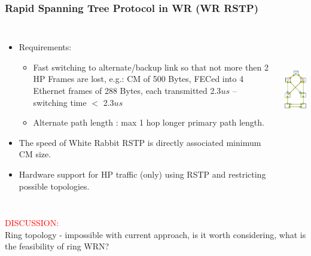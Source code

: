 \documentclass[]{beamer}
\begin{document}
\begin{frame}
  \frametitle{Rapid Spanning Tree Protocol in WR (WR RSTP)}
  
  \begin{columns}[c]
  \column{3.8in} 

  \begin{itemize}
  \item Requirements:
  \begin{itemize}
    \item Fast switching to alternate/backup link so that not more then 2 HP
          Frames are lost, e.g.: CM of 500 Bytes, FECed into 4 Ethernet frames
          of 288 Bytes, each transmitted 2.3$us$ -- switching time $<$ 2.3$us$
    \item Alternate path length : max 1 hop longer primary path length.
  \end{itemize}
  \item The speed of White Rabbit RSTP is directly associated minimum CM size.
  \item Hardware support for HP traffic (only) using RSTP and restricting
        possible topologies.
  \end{itemize}

  \column{1.2in}

  \centering
  \includegraphics[height=5cm,keepaspectratio]{robustness/RSTPcomplex.png}

  \end{columns}
\centering
\textcolor{red}{DISCUSSION:} \\
Ring topology - impossible with current approach, is it worth considering, what
is the feasibility of ring WRN?

\end{frame}
\end{document}
